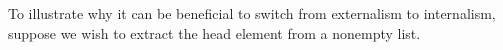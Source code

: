 To illustrate why it can be beneficial to switch from externalism to internalism, suppose we wish to extract the head element from a nonempty list.
